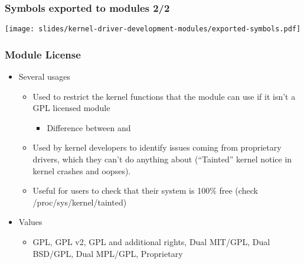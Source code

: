 \begin{frame}
  \frametitle{Symbols exported to modules 2/2}
  \begin{center}
    \texttt{[image: slides/kernel-driver-development-modules/exported-symbols.pdf]}
  \end{center}
\end{frame}

\begin{frame}
  \frametitle{Module License}
  \begin{itemize}
  \item Several usages
    \begin{itemize}
    \item Used to restrict the kernel functions that the module can
      use if it isn't a GPL licensed module
      \begin{itemize}
      \item Difference between  and
      \end{itemize}
    \item Used by kernel developers to identify issues coming from
      proprietary drivers, which they can't do anything about
      (“Tainted” kernel notice in kernel crashes and oopses).
    \item Useful for users to check that their system is 100\% free
      (check /proc/sys/kernel/tainted)
    \end{itemize}
  \item Values
    \begin{itemize}
    \item GPL, GPL v2, GPL and additional rights, Dual MIT/GPL, Dual
      BSD/GPL, Dual MPL/GPL, Proprietary
    \end{itemize}
  \end{itemize}
\end{frame}


